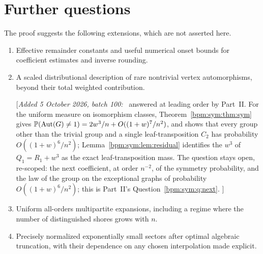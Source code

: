 \documentclass[11pt,a4paper]{article}
\theoremstyle{remark}\newtheorem{remark}[theorem]{Remark}%
\newcommand{\Aut}{\operatorname{Aut}}\newcommand{\ee}{\mathrm e}
\newenvironment{writenote}{\par\smallskip\noindent\small[\textit{Added 5 October 2026, batch 100:}\ }{]\par\smallskip}
\begin{document}
\section{Further questions}\label{bpm:sec:questions}
The proof suggests the following extensions, which are not asserted here.
\begin{enumerate}\renewcommand{\theenumi}{I.\arabic{enumi}}\renewcommand{\labelenumi}{\theenumi.}%
\item\label{bpm:q:effective} Effective remainder constants and useful numerical onset bounds for
coefficient estimates and inverse rounding.
\item\label{bpm:q:symmetry} A scaled distributional description of rare nontrivial vertex
automorphisms, beyond their total weighted contribution.

\begin{writenote}
answered at leading order by Part~II. For the uniform measure on
isomorphism classes, Theorem~\ref{bpm:sym:thm:sym} gives
$\Pp(\Aut(G)\ne1)=2w^3/n+O((1+w)^7/n^2)$, and shows that every group other
than the trivial group and a single leaf-transposition $C_2$ has probability
$O((1+w)^6/n^2)$; Lemma~\ref{bpm:sym:lem:residual} identifies the $w^3$ of
$Q_1=R_1+w^3$ as the exact leaf-transposition mass. The question stays
open, re-scoped: the next coefficient, at order $n^{-2}$, of the symmetry
probability, and the law of the group on the exceptional graphs of
probability $O((1+w)^6/n^2)$; this is Part~II's
Question~\ref{bpm:sym:q:next}.
\end{writenote}
\item\label{bpm:q:multipartite} Uniform all-orders multipartite expansions, including a regime where
the number of distinguished shores grows with $n$.
\item\label{bpm:q:sectors} Precisely normalized exponentially small sectors after optimal
algebraic truncation, with their dependence on any chosen interpolation
made explicit.
\end{enumerate}
\end{document}
